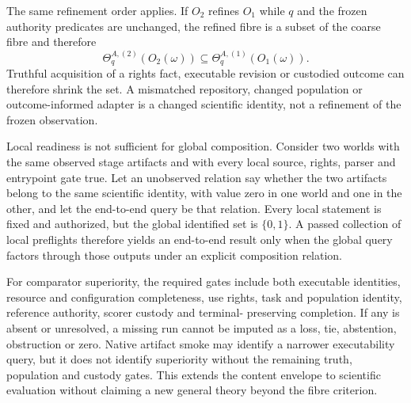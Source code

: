 The same refinement order applies. If $O_2$ refines $O_1$ while $q$ and the
frozen authority predicates are unchanged, the refined fibre is a subset of
the coarse fibre and therefore
\begin{equation}
 \Theta_q^{A,(2)}(O_2(\omega))
 \subseteq
 \Theta_q^{A,(1)}(O_1(\omega)).
 \label{eq:authority-refinement}
\end{equation}
Truthful acquisition of a rights fact, executable revision or custodied
outcome can therefore shrink the set. A mismatched repository, changed
population or outcome-informed adapter is a changed scientific identity, not
a refinement of the frozen observation.

Local readiness is not sufficient for global composition. Consider two worlds
with the same observed stage artifacts and with every local source, rights,
parser and entrypoint gate true. Let an unobserved relation say whether the two
artifacts belong to the same scientific identity, with value zero in one world
and one in the other, and let the end-to-end query be that relation. Every
local statement is fixed and authorized, but the global identified set is
$\{0,1\}$. A passed collection of local preflights therefore yields an
end-to-end result only when the global query factors through those outputs
under an explicit composition relation.

For comparator superiority, the required gates include both executable
identities, resource and configuration completeness, use rights, task and
population identity, reference authority, scorer custody and terminal-
preserving completion. If any is absent or unresolved, a missing run cannot be
imputed as a loss, tie, abstention, obstruction or zero. Native artifact smoke
may identify a narrower executability query, but it does not identify
superiority without the remaining truth, population and custody gates. This
extends the content envelope to scientific evaluation without claiming a new
general theory beyond the fibre criterion.

